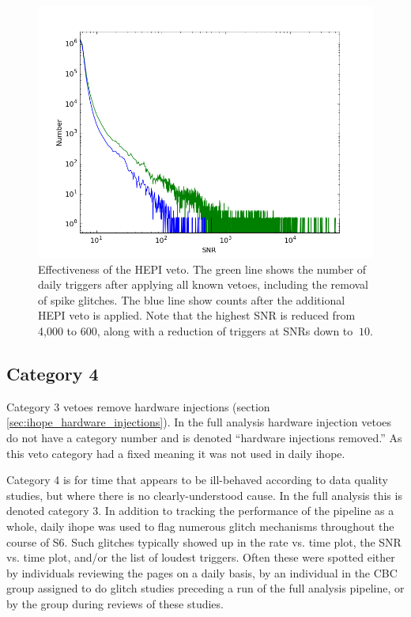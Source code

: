 \begin{figure}
  \includegraphics[width=\linewidth]{figures/detchar/L1-S6B2-snrhist_Cat1234_Spike_HEPI}
  \caption[Effectiveness of the HEPI veto] {
  \label{f:hepi_veto_effectiveness}
Effectiveness of the HEPI veto. The green line shows the number of
daily triggers after applying all known vetoes, including the removal
of spike glitches.  The blue line show counts after the additional
HEPI veto is applied.  Note that the highest SNR is reduced from 
4,000 to 600, along with a reduction of triggers at SNRs down to 
$~ 10$.}
\end{figure}


\subsection{Category 4}

Category 3 vetoes remove hardware injections (section
\ref{sec:ihope_hardware_injections}).  In the full analysis hardware
injection vetoes do not have a category number and is denoted
``hardware injections removed.''  As this veto category had a fixed
meaning it was not used in daily ihope.

Category 4 is for time that appears to be ill-behaved according to 
data quality studies, but where there is no clearly-understood 
cause.  In the full analysis this is denoted category 3.
In addition to tracking the performance of the pipeline as a whole,
daily ihope was used to flag numerous glitch mechanisms throughout the
course of S6.  Such glitches typically showed up in the rate vs. time
plot, the SNR vs. time plot, and/or the list of loudest triggers.
Often these were spotted either by individuals reviewing the pages on
a daily basis, by an individual in the CBC group assigned  to do
glitch studies preceding a run of the full analysis pipeline, or by
the group during reviews of these studies.

